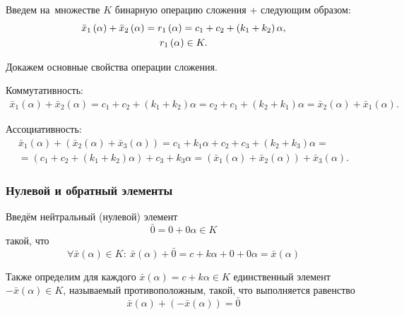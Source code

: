 Введем на~множестве $K$ бинарную операцию сложения + следующим образом:
\begin{gather*}
  \bar{x}_1\left(\alpha \right)+\bar{x}_2\left(\alpha \right)=r_1\left( \alpha  \right)=c_1+c_2+\left(k_1+k_2 \right)\alpha, \notag \\ 
  r_1\left( \alpha  \right)\in K.
\end{gather*}

Докажем основные свойства операции сложения.

Коммутативность:
\begin{gather*}
\bar{x}_1\left( \alpha \right)+\bar{x}_2\left( \alpha \right)=c_1+c_2+\left(k_1+k_2\right)\alpha=c_2+c_1+\left(k_2+k_1 \right)\alpha =\bar{x}_2\left(\alpha \right)+\bar{x}_1\left(\alpha \right).
\end{gather*}

Ассоциативность:
\begin{gather*}
  \bar{x}_1\left(\alpha \right)+\left(\bar{x}_2\left(\alpha \right)+\bar{x}_3\left(\alpha \right) \right)=c_1+k_1\alpha +c_2+c_3+\left(k_2+k_3\right)\alpha={} \\ 
  {}=\left(c_1+c_2+\left(k_1+k_2\right)\alpha \right)+c_3+k_3\alpha =\left(\bar{x}_1\left(\alpha \right)+\bar{x}_2\left(\alpha \right) \right)+\bar{x}_3\left(\alpha \right).
\end{gather*}

\subsubsection*{Нулевой и обратный элементы}

Введём нейтральный (нулевой) элемент
\begin{equation}
\label{eq:fuzzy-kc-zero}
	\bar{0}=0+0\alpha \in K
\end{equation}
такой, что 
\begin{equation}
\label{eq:fuzzy-kc-zeroprop}
	\forall \bar{x}(\alpha )\in K:\ \bar{x}(\alpha )+\bar{0}=c+k\alpha +0+0\alpha =\bar{x}(\alpha )
\end{equation}

Также определим для каждого $\bar{x}\left( \alpha  \right)=c+k\alpha \in K$ единственный элемент $-\bar{x}\left(\alpha \right)\in K$, называемый противоположным, такой, что выполняется равенство
\begin{equation}
\label{eq:fuzzy-kc-inverse-minus}
	\bar{x}\left( \alpha  \right)+\left( -\bar{x}\left( \alpha  \right) \right)=\bar{0}
\end{equation}

